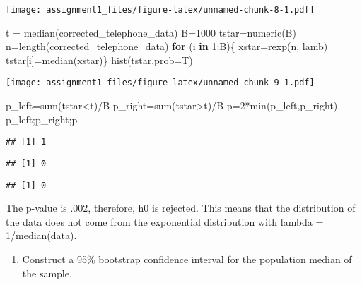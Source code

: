 \documentclass[
]{article}
\newenvironment{Shaded}{\begin{snugshade}}{\end{snugshade}}
\newcommand{\AttributeTok}[1]{\textcolor[rgb]{0.77,0.63,0.00}{#1}}
\newcommand{\ControlFlowTok}[1]{\textcolor[rgb]{0.13,0.29,0.53}{\textbf{#1}}}
\newcommand{\DecValTok}[1]{\textcolor[rgb]{0.00,0.00,0.81}{#1}}
\newcommand{\FunctionTok}[1]{\textcolor[rgb]{0.00,0.00,0.00}{#1}}
\newcommand{\NormalTok}[1]{#1}
\newcommand{\OtherTok}[1]{\textcolor[rgb]{0.56,0.35,0.01}{#1}}
\newcommand{\SpecialCharTok}[1]{\textcolor[rgb]{0.00,0.00,0.00}{#1}}
\providecommand{\tightlist}{%
  \setlength{\itemsep}{0pt}\setlength{\parskip}{0pt}}
\begin{document}
\texttt{[image: assignment1\_files/figure-latex/unnamed-chunk-8-1.pdf]}

\begin{Shaded}
\begin{Highlighting}[]
\NormalTok{t }\OtherTok{=} \FunctionTok{median}\NormalTok{(corrected\_telephone\_data)}
\NormalTok{B}\OtherTok{=}\DecValTok{1000}
\NormalTok{tstar}\OtherTok{=}\FunctionTok{numeric}\NormalTok{(B)}
\NormalTok{n}\OtherTok{=}\FunctionTok{length}\NormalTok{(corrected\_telephone\_data)}
\ControlFlowTok{for}\NormalTok{ (i }\ControlFlowTok{in} \DecValTok{1}\SpecialCharTok{:}\NormalTok{B)\{}
\NormalTok{  xstar}\OtherTok{=}\FunctionTok{rexp}\NormalTok{(n, lamb)}
\NormalTok{  tstar[i]}\OtherTok{=}\FunctionTok{median}\NormalTok{(xstar)\}}
  \FunctionTok{hist}\NormalTok{(tstar,}\AttributeTok{prob=}\NormalTok{T)}
\end{Highlighting}
\end{Shaded}

\texttt{[image: assignment1\_files/figure-latex/unnamed-chunk-9-1.pdf]}

\begin{Shaded}
\begin{Highlighting}[]
\NormalTok{p\_left}\OtherTok{=}\FunctionTok{sum}\NormalTok{(tstar}\SpecialCharTok{\textless{}}\NormalTok{t)}\SpecialCharTok{/}\NormalTok{B}
\NormalTok{p\_right}\OtherTok{=}\FunctionTok{sum}\NormalTok{(tstar}\SpecialCharTok{\textgreater{}}\NormalTok{t)}\SpecialCharTok{/}\NormalTok{B}
\NormalTok{p}\OtherTok{=}\DecValTok{2}\SpecialCharTok{*}\FunctionTok{min}\NormalTok{(p\_left,p\_right)}
\NormalTok{p\_left;p\_right;p}
\end{Highlighting}
\end{Shaded}

\begin{verbatim}
## [1] 1
\end{verbatim}

\begin{verbatim}
## [1] 0
\end{verbatim}

\begin{verbatim}
## [1] 0
\end{verbatim}

The p-value is .002, therefore, h0 is rejected. This means that the
distribution of the data does not come from the exponential distribution
with lambda = 1/median(data).

\begin{enumerate}
\def\labelenumi{\alph{enumi})}
\setcounter{enumi}{2}
\tightlist
\item
  Construct a 95\% bootstrap confidence interval for the population
  median of the sample.
\end{enumerate}
\end{document}
